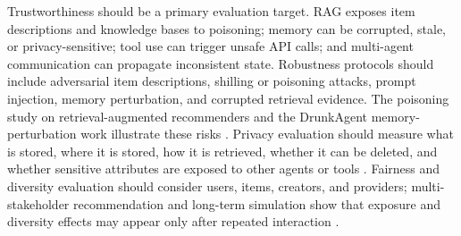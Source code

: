 Trustworthiness should be a primary evaluation target. RAG exposes item descriptions and knowledge bases to poisoning; memory can be corrupted, stale, or privacy-sensitive; tool use can trigger unsafe API calls; and multi-agent communication can propagate inconsistent state. Robustness protocols should include adversarial item descriptions, shilling or poisoning attacks, prompt injection, memory perturbation, and corrupted retrieval evidence. The poisoning study on retrieval-augmented recommenders and the DrunkAgent memory-perturbation work illustrate these risks \cite{nazary2025stealthy,yang2025get,ning2024cheatagent, li2026agentattack, gu2026llm}. Privacy evaluation should measure what is stored, where it is stored, how it is retrieved, whether it can be deleted, and whether sensitive attributes are exposed to other agents or tools \cite{zhang2025towards,long2025cloud}. Fairness and diversity evaluation should consider users, items, creators, and providers; multi-stakeholder recommendation and long-term simulation show that exposure and diversity effects may appear only after repeated interaction \cite{banerjee2025collab,jannach2025rethinking,ye2025creagent,sukiennik2025simulating}.

